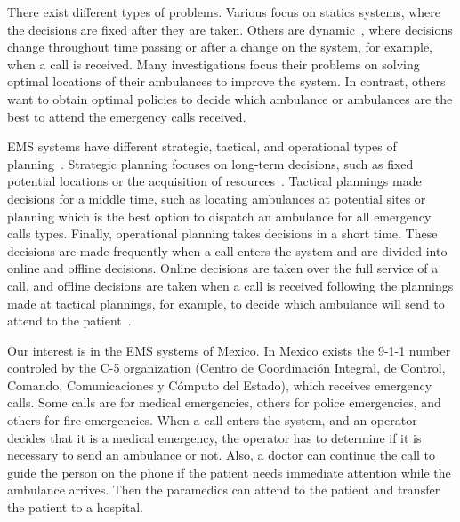 There exist different types of problems. Various focus on statics systems, where the decisions are fixed after they are taken. Others are dynamic~\cite{brotcorne2003ambulance}, where decisions change throughout time passing or after a change on the system, for example, when a call is received. Many investigations focus their problems on solving optimal locations of their ambulances to improve the system. In contrast, others want to obtain optimal policies to decide which ambulance or ambulances are the best to attend the emergency calls received.

EMS systems have different strategic, tactical, and operational types of plan\-ning~\cite{galvao2008emergency}. Strategic planning focuses on long-term decisions, such as fixed potential locations or the acquisition of resources~\cite{aboueljinane2013review}. Tactical plannings made decisions for a middle time, such as locating ambulances at potential sites or planning which is the best option to dispatch an ambulance for all emergency calls types. Finally, operational planning takes decisions in a short time. These decisions are made frequently when a call enters the system and are divided into online and offline decisions. Online decisions are taken over the full service of a call, and offline decisions are taken when a call is received following the plannings made at tactical plannings, for example, to decide which ambulance will send to attend to the pa\-tient~\cite{hulshof2012taxonomic}.

Our interest is in the EMS systems of Mexico. In Mexico exists the 9-1-1 number controled by the C-5 organization (Centro de Coordinación Integral, de Control, Comando, Comunicaciones y Cómputo del Estado), which receives emergency calls. Some calls are for medical emergencies, others for police e\-mer\-gen\-cies, and others for fire emergencies. When a call enters the system, and an operator decides that it is a medical emergency, the operator has to determine if it is necessary to send an ambulance or not. Also, a doctor can continue the call to guide the person on the phone if the patient needs immediate attention while the ambulance arrives. Then the paramedics can attend to the patient and transfer the patient to a hospital.


